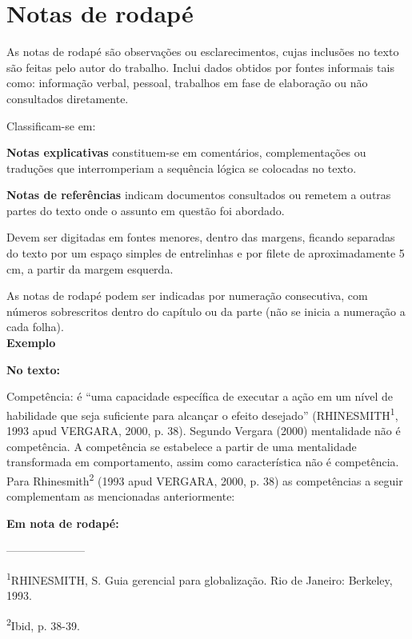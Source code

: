 \section{Notas de rodap\'e}
As notas de rodap\'e são observações ou esclarecimentos, cujas inclusões no texto são feitas pelo autor do trabalho. Inclui dados obtidos por fontes informais tais como: informação verbal, pessoal, trabalhos em fase de elaboração ou não consultados diretamente.

\newpage

Classificam-se em:\\
\begin{alineas}
\item
\textbf{Notas explicativas} constituem-se em coment\'arios, complementações ou traduções que interromperiam a sequ\^encia lógica se colocadas no texto. \cite{Soares2002}

\item
\textbf{Notas de refer\^encias} indicam documentos consultados ou remetem a outras partes do texto onde o assunto em questão foi abordado. \\
\end{alineas}

Devem ser digitadas em fontes menores, dentro das margens, ficando separadas do texto por um espaço simples de entrelinhas e por filete de aproximadamente 5 cm, a partir da margem esquerda.

As notas de rodap\'e podem ser indicadas por numeração consecutiva, com números sobrescritos dentro do capítulo ou da parte (não se inicia a numeração a cada folha).\\

\textbf{Exemplo}

\begin{alineas}

\item

\textbf{No texto:}

Compet\^encia: \'e “uma capacidade específica de executar a ação em um nível de habilidade que seja suficiente para alcançar o efeito desejado” (RHINESMITH\textsuperscript{1}, 1993 apud VERGARA, 2000, p. 38).
Segundo Vergara (2000) mentalidade não \'e compet\^encia. A compet\^encia se estabelece a partir de uma mentalidade transformada em comportamento, assim como característica não \'e compet\^encia.
Para Rhinesmith\textsuperscript{2} (1993 apud VERGARA, 2000, p. 38) as compet\^encias a seguir complementam as mencionadas anteriormente:

\textbf{Em nota de rodap\'e:}

---------------------

\textsuperscript{1}RHINESMITH, S. Guia gerencial para globalização. Rio de Janeiro: Berkeley, 1993.

\textsuperscript{2}Ibid, p. 38-39.


\end{alineas}

